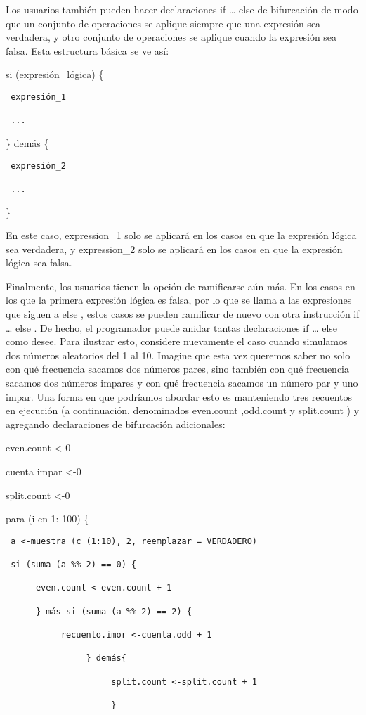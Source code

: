 \documentclass[
]{book}
\begin{document}
Los usuarios también pueden hacer declaraciones if \ldots{} else de bifurcación de modo que un conjunto de operaciones se aplique siempre que una expresión sea verdadera, y otro conjunto de operaciones se aplique cuando la expresión sea falsa. Esta estructura básica se ve así:

si (expresión\_lógica) \{

\begin{verbatim}
 expresión_1

 ...
\end{verbatim}

\} demás \{

\begin{verbatim}
 expresión_2

 ...
\end{verbatim}

\}

En este caso, expression\_1 solo se aplicará en los casos en que la expresión lógica sea verdadera, y expression\_2 solo se aplicará en los casos en que la expresión lógica sea falsa.

Finalmente, los usuarios tienen la opción de ramificarse aún más. En los casos en los que la primera expresión lógica es falsa, por lo que se llama a las expresiones que siguen a else , estos casos se pueden ramificar de nuevo con otra instrucción if \ldots{} else . De hecho, el programador puede anidar tantas declaraciones if \ldots{} else como desee. Para ilustrar esto, considere nuevamente el caso cuando simulamos dos números aleatorios del 1 al 10. Imagine que esta vez queremos saber no solo con qué frecuencia sacamos dos números pares, sino también con qué frecuencia sacamos dos números impares y con qué frecuencia sacamos un número par y uno impar. Una forma en que podríamos abordar esto es manteniendo tres recuentos en ejecución (a continuación, denominados even.count ,odd.count y split.count ) y agregando declaraciones de bifurcación adicionales:

even.count \textless-0

cuenta impar \textless-0

split.count \textless-0

para (i en 1: 100) \{

\begin{verbatim}
 a <-muestra (c (1:10), 2, reemplazar = VERDADERO)

 si (suma (a %% 2) == 0) {

      even.count <-even.count + 1

      } más si (suma (a %% 2) == 2) {

           recuento.imor <-cuenta.odd + 1

                } demás{

                     split.count <-split.count + 1

                     }
\end{verbatim}
\end{document}

